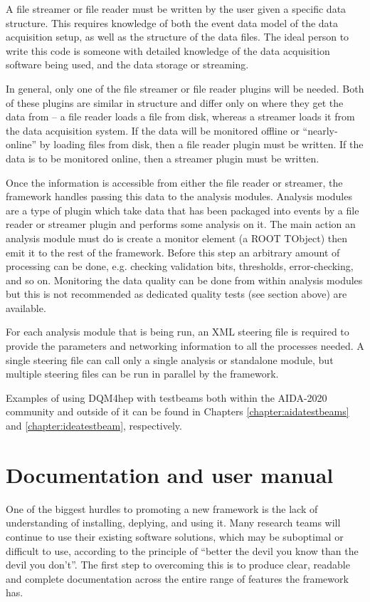 A file streamer or file reader must be written by the user given a specific data structure. This requires knowledge of both the event data model of the data acquisition setup, as well as the structure of the data files. The ideal person to write this code is someone with detailed knowledge of the data acquisition software being used, and the data storage or streaming. 

In general, only one of the file streamer or file reader plugins will be needed. Both of these plugins are similar in structure and differ only on where they get the data from -- a file reader loads a file from disk, whereas a streamer loads it from the data acquisition system. If the data will be monitored offline or ``nearly-online'' by loading files from disk, then a file reader plugin must be written. If the data is to be monitored online, then a streamer plugin must be written. 

Once the information is accessible from either the file reader or streamer, the framework handles passing this data to the analysis modules. Analysis modules are a type of plugin which take data that has been packaged into events by a file reader or streamer plugin and performs some analysis on it. The main action an analysis module must do is create a monitor element (a ROOT TObject) then emit it to the rest of the framework. Before this step an arbitrary amount of processing can be done, e.g. checking validation bits, thresholds, error-checking, and so on. Monitoring the data quality can be done from within analysis modules but this is not recommended as dedicated quality tests (see section above) are available.

For each analysis module that is being run, an XML steering file is required to provide the parameters and networking information to all the processes needed. A single steering file can call only a single analysis or standalone module, but multiple steering files can be run in parallel by the framework.

Examples of using DQM4hep with testbeams both within the AIDA-2020 community and outside of it can be found in Chapters \ref{chapter:aidatestbeams} and \ref{chapter:ideatestbeam}, respectively.

\section{Documentation and user manual}
One of the biggest hurdles to promoting a new framework is the lack of understanding of installing, deplying, and using it. Many research teams will continue to use their existing software solutions, which may be suboptimal or difficult to use, according to the principle of ``better the devil you know than the devil you don't''. The first step to overcoming this is to produce clear, readable and complete documentation across the entire range of features the framework has.

